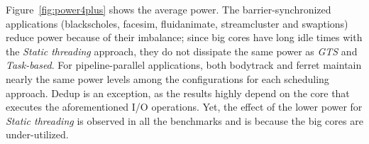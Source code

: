 Figure~\ref{fig:power4plus} shows the average power. The barrier-synchronized applications (blackscholes, facesim, fluidanimate, streamcluster and swaptions) reduce power because 
of their imbalance; since big cores have long idle times with the \emph{Static threading} approach, they do not dissipate the same power as \emph{GTS} and \emph{Task-based}.
For pipeline-parallel applications, both bodytrack and ferret maintain nearly the same 
power levels among the configurations for each scheduling approach. Dedup is an exception, as the 
results highly depend on the core that executes the aforementioned I/O operations. Yet, the 
effect of the lower power for \emph{Static threading} is observed in all the benchmarks and is because the big cores are under-utilized. %








